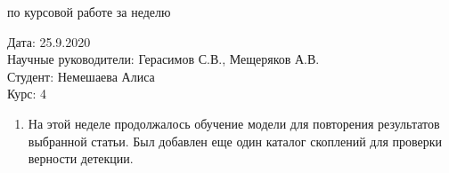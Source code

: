 \documentclass{article}
\begin{document}
\begin{center}{ по курсовой работе за неделю\\}\end{center}
Дата: 25.9.2020\\
Научные руководители: Герасимов С.В., Мещеряков А.В.\\
Студент: Немешаева Алиса\\
Курс: 4\\

\renewcommand{\labelitemi}{$\blacksquare$}
\renewcommand\labelitemii{$\square$}
\begin{enumerate}
    \item На этой неделе продолжалось обучение модели для повторения результатов выбранной статьи. 
        Был добавлен еще один каталог скоплений для проверки верности детекции.\\
    

\end{enumerate}
\end{document}
